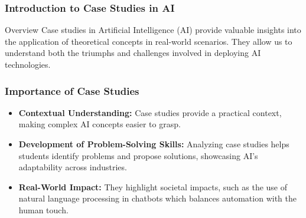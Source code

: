 \documentclass[aspectratio=169]{beamer}
\begin{document}
\frame{\titlepage}

\begin{frame}[fragile]
    \frametitle{Introduction to Case Studies in AI}
    \begin{block}{Overview}
        Case studies in Artificial Intelligence (AI) provide valuable insights into the application of theoretical concepts in real-world scenarios. 
        They allow us to understand both the triumphs and challenges involved in deploying AI technologies.
    \end{block}
\end{frame}

\begin{frame}[fragile]
    \frametitle{Importance of Case Studies}
    \begin{itemize}
        \item \textbf{Contextual Understanding:} Case studies provide a practical context, making complex AI concepts easier to grasp.
        \item \textbf{Development of Problem-Solving Skills:} Analyzing case studies helps students identify problems and propose solutions, showcasing AI's adaptability across industries.
        \item \textbf{Real-World Impact:} They highlight societal impacts, such as the use of natural language processing in chatbots which balances automation with the human touch.
    \end{itemize}
\end{frame}
\end{document}
